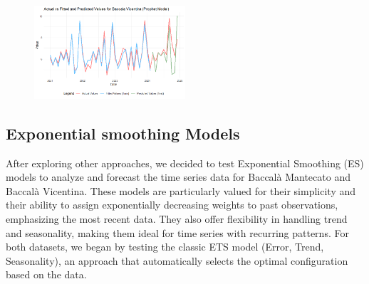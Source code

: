 \documentclass[10pt,twocolumn,letterpaper]{article}
\begin{document}
\begin{figure}[H]
    \centering
    \includegraphics[width=0.5\textwidth]{PlotsBEFD/PRED_PROPHET_VIC.png} 
    \caption{}
    \label{fig:PRED_PROPHET_VIC}
\end{figure}





\subsection{Exponential smoothing Models}
After exploring other approaches, we decided to test Exponential Smoothing (ES) models to analyze and forecast the time series data for Baccalà Mantecato and Baccalà Vicentina. These models are particularly valued for their simplicity and their ability to assign exponentially decreasing weights to past observations, emphasizing the most recent data. They also offer flexibility in handling trend and seasonality, making them ideal for time series with recurring patterns.
For both datasets, we began by testing the classic ETS model (Error, Trend, Seasonality), an approach that automatically selects the optimal configuration based on the data.
\end{document}
